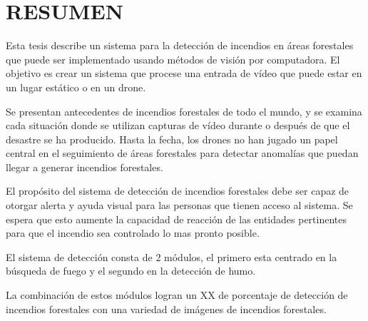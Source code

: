 \chapter*{RESUMEN}

\noindent Esta tesis describe un sistema para la detección de incendios en áreas forestales que puede ser implementado usando métodos de visión por computadora. El objetivo es crear un sistema que procese una entrada de vídeo que puede estar en un lugar estático o en un drone.

\noindent Se presentan antecedentes de incendios forestales de todo el mundo, y se examina cada situación donde se utilizan capturas de vídeo durante o después de que el desastre se ha producido. Hasta la fecha, los drones no han jugado un papel central en el seguimiento de áreas forestales para detectar anomalías que puedan llegar a generar incendios forestales.

\noindent El propósito del sistema de detección de incendios forestales debe ser capaz de otorgar alerta y ayuda visual para las personas que tienen acceso al sistema. Se espera que esto aumente la capacidad de reacción de las entidades pertinentes para que el incendio sea controlado lo mas pronto posible.

\noindent El sistema de detección consta de 2 módulos, el primero esta centrado en la búsqueda de fuego y el segundo en la detección de humo. %

\noindent La combinación de estos módulos logran un XX de porcentaje de detección de incendios forestales con una variedad de imágenes de incendios forestales.
